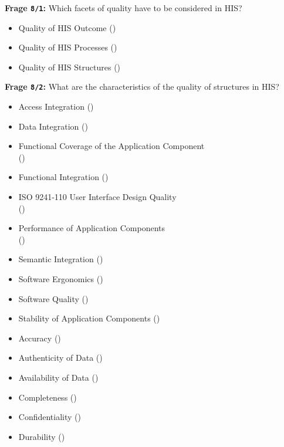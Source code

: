 \textbf{Frage \texttt{8/1}:} Which facets of quality have to be considered in HIS?

\begin{itemize}
  \item Quality of HIS Outcome ()
  \item Quality of HIS Processes ()
  \item Quality of HIS Structures ()
\end{itemize}

\textbf{Frage \texttt{8/2}:} What are the characteristics of the quality of structures in HIS?

\begin{itemize}
  \item Access Integration ()
  \item Data Integration ()
  \item Functional Coverage of the Application Component \\
  ()
  \item Functional Integration ()
  \item ISO 9241-110 User Interface Design Quality \\
  ()
  \item Performance of Application Components \\
  ()
  \item Semantic Integration ()
  \item Software Ergonomics ()
  \item Software Quality ()
  \item Stability of Application Components ()
  \item Accuracy ()
  \item Authenticity of Data ()
  \item Availability of Data ()
  \item Completeness ()
  \item Confidentiality ()
  \item Durability ()

\end{itemize}
